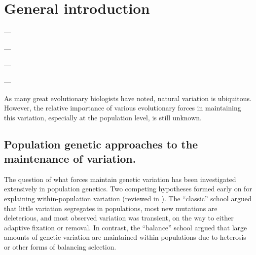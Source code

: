 \setlength{\parindent}{0ex}
\setlength{\parskip}{2ex}

\chapter{General introduction}

\begin{flushright}
--- \citet{darwin1859}
\end{flushright}

\begin{flushright}
--- \citet{haldane1932}
\end{flushright}

\begin{flushright}
--- \citet{dob1937}
\end{flushright}

\begin{flushright}
--- \citet{Lewontin1966-kz}
\end{flushright}

As many great evolutionary biologists have noted, natural variation is ubiquitous. However, the relative importance of various evolutionary forces in maintaining this variation, especially at the population level, is still unknown. 

\section{Population genetic approaches to the maintenance of variation.}

The question of what forces maintain genetic variation has been investigated extensively in population genetics. Two competing hypotheses formed early on for explaining within-population variation (reviewed in \citet{lewontin1974}). The “classic” school argued that little variation segregates in populations, most new mutations are deleterious, and most observed variation was transient, on the way to either adaptive fixation or removal. In contrast, the “balance” school argued that large amounts of genetic variation are maintained within populations due to heterosis or other forms of balancing selection. 

